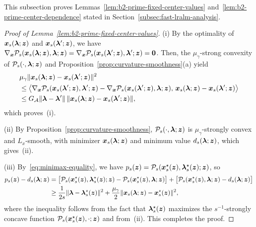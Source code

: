 This subsection proves Lemmas~\ref{lem:b2-prime-fixed-center-values}
and~\ref{lem:b2-prime-center-dependence} stated in
Section~\ref{subsec:fast-lralm-analysis}.

\begin{proof}[Proof of Lemma~\ref{lem:b2-prime-fixed-center-values}]
(i) By the optimality of \(\bm{x}_s(\bm{\lambda};\bm{z})\) and \(\bm{x}_s(\bm{\lambda}';\bm{z})\),
we have
\(\nabla_{\bm{x}}\mathcal P_s(\bm{x}_s(\bm{\lambda};\bm{z}),\bm{\lambda};\bm{z})
=\nabla_{\bm{x}}\mathcal P_s(\bm{x}_s(\bm{\lambda}';\bm{z}),\bm{\lambda}';\bm{z})=\bm{0}\). Then, the
\(\mu_\gamma\)-strong convexity of \(\mathcal P_s(\cdot,\bm{\lambda};\bm{z})\)
and Proposition~\ref{prop:curvature-smoothness}(a) yield
\begin{align*}
    &\mu_\gamma\|\bm{x}_s(\bm{\lambda};\bm{z})-\bm{x}_s(\bm{\lambda}';\bm{z})\|^2\\
    &\le\bigl\langle\nabla_{\bm{x}}\mathcal P_s(\bm{x}_s(\bm{\lambda}';\bm{z}),\bm{\lambda}';\bm{z})
    -\nabla_{\bm{x}}\mathcal P_s(\bm{x}_s(\bm{\lambda}';\bm{z}),\bm{\lambda};\bm{z}),\,
    \bm{x}_s(\bm{\lambda};\bm{z})-\bm{x}_s(\bm{\lambda}';\bm{z})\bigr\rangle\\
    &\le G_{\mathcal{A}}\|\bm{\lambda}-\bm{\lambda}'\|\,
    \|\bm{x}_s(\bm{\lambda};\bm{z})-\bm{x}_s(\bm{\lambda}';\bm{z})\|,
\end{align*}
which proves~(i).

(ii) By Proposition~\ref{prop:curvature-smoothness},
\(\mathcal P_s(\cdot,\bm{\lambda};\bm{z})\) is \(\mu_\gamma\)-strongly convex and
\(L_x\)-smooth, with minimizer \(\bm{x}_s(\bm{\lambda};\bm{z})\) and minimum value
\(d_s(\bm{\lambda};\bm{z})\), which gives~(ii).

(iii) By~\eqref{eq:minimax-equality}, we have
\(p_s(\bm{z})=\mathcal P_s(\bm{x}_s^\star(\bm{z}),\bm{\lambda}_s^\star(\bm{z});\bm{z})\), so
\begin{align*}
    p_s(\bm{z})-d_s(\bm{\lambda};\bm{z})
    &=\bigl[\mathcal P_s(\bm{x}_s^\star(\bm{z}),\bm{\lambda}_s^\star(\bm{z});\bm{z})
    -\mathcal P_s(\bm{x}_s^\star(\bm{z}),\bm{\lambda};\bm{z})\bigr]
    +\bigl[\mathcal P_s(\bm{x}_s^\star(\bm{z}),\bm{\lambda};\bm{z})-d_s(\bm{\lambda};\bm{z})\bigr]\\
    &\ge\frac{1}{2s}\|\bm{\lambda}-\bm{\lambda}_s^\star(\bm{z})\|^2
    +\frac{\mu_\gamma}{2}\|\bm{x}_s(\bm{\lambda};\bm{z})-\bm{x}_s^\star(\bm{z})\|^2,
\end{align*}
where the inequality follows from the fact that \(\bm{\lambda}_s^\star(\bm{z})\)
maximizes the \(s^{-1}\)-strongly concave function
\(\mathcal P_s(\bm{x}_s^\star(\bm{z}),\cdot;\bm{z})\) and from~(ii). This completes
the proof.
\end{proof}

